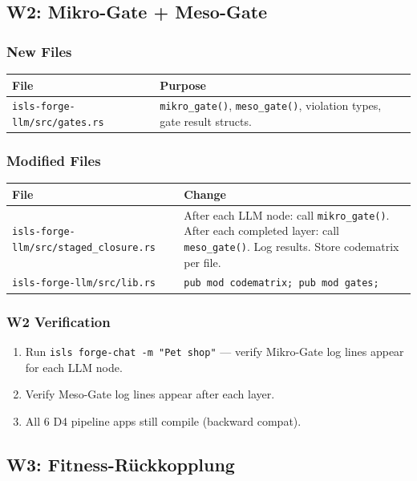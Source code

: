\documentclass[11pt,a4paper]{article}
\begin{document}
\subsection{W2: Mikro-Gate + Meso-Gate}

\subsubsection{New Files}

\begin{longtable}{lp{10cm}}
\toprule
\textbf{File} & \textbf{Purpose} \\
\midrule
\texttt{isls-forge-llm/src/gates.rs}
  & \texttt{mikro\_gate()}, \texttt{meso\_gate()}, violation 
    types, gate result structs. \\
\bottomrule
\end{longtable}

\subsubsection{Modified Files}

\begin{longtable}{lp{10cm}}
\toprule
\textbf{File} & \textbf{Change} \\
\midrule
\texttt{isls-forge-llm/src/staged\_closure.rs}
  & After each LLM node: call \texttt{mikro\_gate()}. 
    After each completed layer: call \texttt{meso\_gate()}. 
    Log results. Store codematrix per file. \\
\texttt{isls-forge-llm/src/lib.rs}
  & \texttt{pub mod codematrix; pub mod gates;} \\
\bottomrule
\end{longtable}

\subsubsection{W2 Verification}

\begin{enumerate}[nosep]
\item Run \texttt{isls forge-chat -m "Pet shop"} --- verify 
      Mikro-Gate log lines appear for each LLM node.
\item Verify Meso-Gate log lines appear after each layer.
\item All 6 D4 pipeline apps still compile (backward compat).
\end{enumerate}


\subsection{W3: Fitness-R\"uckkopplung}
\end{document}
